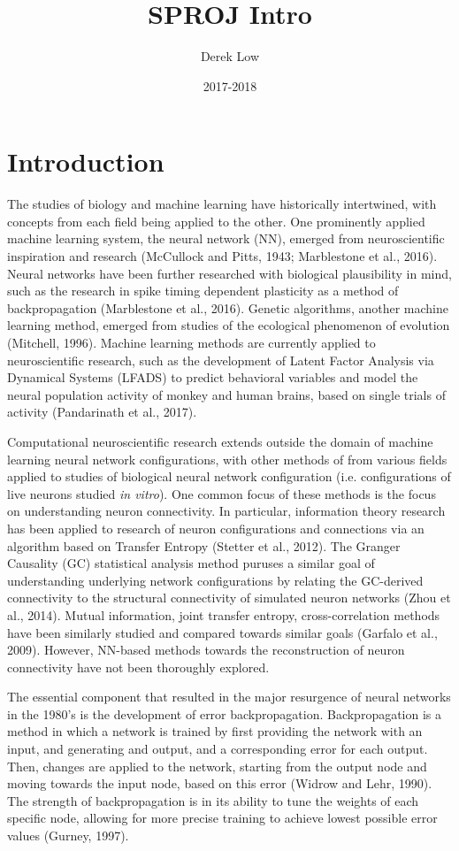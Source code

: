 \documentclass{article}
\title{SPROJ Intro}
\author{Derek Low}
\date{2017-2018}
\newcommand\tab[1][1cm]{\hspace*{#1}}
\begin{document}
\maketitle

\section{Introduction}
\tab The studies of biology and machine learning have historically intertwined, with concepts from each field being applied to the other. One prominently applied machine learning system, the neural network (NN), emerged from neuroscientific inspiration and research (McCullock and Pitts, 1943; Marblestone et al., 2016). Neural networks have been further researched with biological plausibility in mind, such as the research in spike timing dependent plasticity as a method of backpropagation (Marblestone et al., 2016). Genetic algorithms, another machine learning method, emerged from studies of the ecological phenomenon of evolution (Mitchell, 1996). Machine learning methods are currently applied to neuroscientific research, such as the development of  Latent Factor Analysis via Dynamical Systems (LFADS) to predict behavioral variables and model the neural population activity of monkey and human brains, based on single trials of activity (Pandarinath et al., 2017).\par
\tab Computational neuroscientific research extends outside the domain of machine learning neural network configurations, with other methods of from various fields applied to studies of biological neural network configuration (i.e. configurations of live neurons studied \textit{in vitro}). One common focus of these methods is the focus on understanding neuron connectivity. In particular, information theory research has been applied to research of neuron configurations and connections via an algorithm based on Transfer Entropy (Stetter et al., 2012). The Granger Causality (GC) statistical analysis method puruses a similar goal of understanding underlying network configurations by relating the GC-derived connectivity to the structural connectivity of simulated neuron networks (Zhou et al., 2014). Mutual information, joint transfer entropy, cross-correlation methods have been similarly studied and compared towards similar goals (Garfalo et al., 2009). However, NN-based methods towards the reconstruction of neuron connectivity have not been thoroughly explored.\par
\tab The essential component that resulted in the major resurgence of neural networks in the 1980's is the development of error backpropagation. Backpropagation is a method in which a network is trained by first providing the network with an input, and generating and output, and a corresponding error for each output. Then, changes are applied to the network, starting from the output node and moving towards the input node, based on this error (Widrow and Lehr, 1990). The strength of backpropagation is in its ability to tune the weights of each specific node, allowing for more precise training to achieve lowest possible error values (Gurney, 1997).\par
\end{document}
